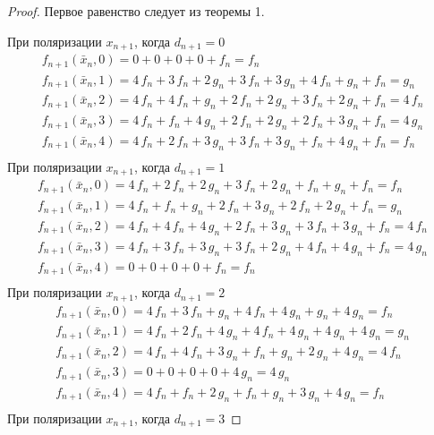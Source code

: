 \documentclass[bibliography=totoc, a4paper, 14pt]{extarticle}
\begin{document}
\begin{proof}

Первое равенство следует из теоремы 1.

При поляризации $x_{n+1}$, когда $d_{n+1} = 0$
$$\begin{array}{l}
f_{n+1}(\bar{x}_n, 0) = 0 + 0 + 0 + 0 + f_n = f_n \\
f_{n+1}(\bar{x}_n, 1) = 4\,f_n + 3\,f_n + 2\,g_n + 3\,f_n + 3\,g_n + 4\,f_n + g_n + f_n = g_n \\
f_{n+1}(\bar{x}_n, 2) = 4\,f_n + 4\,f_n + g_n + 2\,f_n + 2\,g_n + 3\,f_n + 2\,g_n + f_n = 4\,f_n \\
f_{n+1}(\bar{x}_n, 3) = 4\,f_n + f_n + 4\,g_n + 2\,f_n + 2\,g_n + 2\,f_n + 3\,g_n + f_n = 4\,g_n \\
f_{n+1}(\bar{x}_n, 4) = 4\,f_n + 2\,f_n + 3\,g_n + 3\,f_n + 3\,g_n + f_n + 4\,g_n + f_n = f_n \\
\end{array}$$
При поляризации $x_{n+1}$, когда $d_{n+1} = 1$
$$\begin{array}{l}
f_{n+1}(\bar{x}_n, 0) = 4\,f_n + 2\,f_n + 2\,g_n + 3\,f_n + 2\,g_n + f_n + g_n + f_n = f_n \\
f_{n+1}(\bar{x}_n, 1) = 4\,f_n + f_n + g_n + 2\,f_n + 3\,g_n + 2\,f_n + 2\,g_n + f_n = g_n \\
f_{n+1}(\bar{x}_n, 2) = 4\,f_n + 4\,f_n + 4\,g_n + 2\,f_n + 3\,g_n + 3\,f_n + 3\,g_n + f_n = 4\,f_n \\
f_{n+1}(\bar{x}_n, 3) = 4\,f_n + 3\,f_n + 3\,g_n + 3\,f_n + 2\,g_n + 4\,f_n + 4\,g_n + f_n = 4\,g_n \\
f_{n+1}(\bar{x}_n, 4) = 0 + 0 + 0 + 0 + f_n = f_n \\
\end{array}$$
При поляризации $x_{n+1}$, когда $d_{n+1} = 2$
$$\begin{array}{l}
f_{n+1}(\bar{x}_n, 0) = 4\,f_n + 3\,f_n + g_n + 4\,f_n + 4\,g_n + g_n + 4\,g_n = f_n \\
f_{n+1}(\bar{x}_n, 1) = 4\,f_n + 2\,f_n + 4\,g_n + 4\,f_n + 4\,g_n + 4\,g_n + 4\,g_n = g_n \\
f_{n+1}(\bar{x}_n, 2) = 4\,f_n + 4\,f_n + 3\,g_n + f_n + g_n + 2\,g_n + 4\,g_n = 4\,f_n \\
f_{n+1}(\bar{x}_n, 3) = 0 + 0 + 0 + 0 + 4\,g_n = 4\,g_n \\
f_{n+1}(\bar{x}_n, 4) = 4\,f_n + f_n + 2\,g_n + f_n + g_n + 3\,g_n + 4\,g_n = f_n \\
\end{array}$$
При поляризации $x_{n+1}$, когда $d_{n+1} = 3$

\end{proof}
\end{document}
